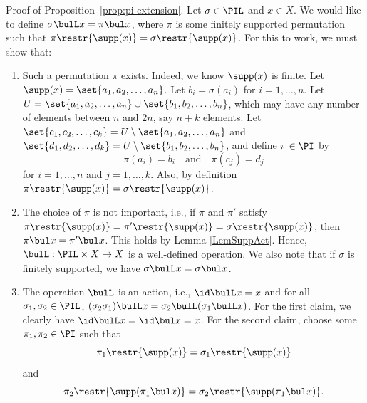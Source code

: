 \documentclass[twoside,11pt]{entics}
\begin{document}
\begin{proof*}{Proof of Proposition~\ref{prop:pi-extension}.}
Let $\sigma\in \PIL$ and $x\in X$. We would like to define $\sigma \bulL x
= \pi \bul x$, where $\pi$ is some finitely supported permutation
such that $\pi\restr{\supp(x)}=\sigma\restr{\supp(x)}$. For this to
work, we must show that:
\begin{enumerate}

\item Such a permutation $\pi$ exists. Indeed, we know $\supp(x)$ is
  finite. Let $\supp(x)=\set{a_1,a_2,\ldots, a_n}$. Let $b_i=\sigma(a_i)$
  for $i=1,\ldots,n$. Let $U=\set{a_1,a_2,\ldots, a_n} \cup
  \set{b_1,b_2,\ldots, b_n}$, which may have any number of elements
  between $n$ and $2n$, say $n+k$ elements. Let $\set{c_1,c_2,\ldots,
    c_k} = U\setminus\set{a_1,a_2,\ldots, a_n}$ and $\set{d_1,d_2,\ldots,
    d_k}=U\setminus\set{b_1,b_2,\ldots, b_n}$, and define $\pi\in \PI$ by
  \[
  \pi(a_i) = b_i \quad \mbox{and} \quad \pi(c_j) = d_j
  \]
  for $i=1,\ldots,n$ and $j=1,\ldots,k$. Also, by definition
  $\pi\restr{\supp(x)}=\sigma\restr{\supp(x)}$.

\item The choice of $\pi$ is not important, i.e., if $\pi$ and
  $\pi'$ satisfy
  $\pi\restr{\supp(x)}=\pi'\restr{\supp(x)}=\sigma\restr{\supp(x)}$,
  then $\pi \bul x = \pi' \bul x$. This holds by Lemma
  \ref{LemSuppAct}. Hence, $\bulL:\PIL\times X \to X$ is a
  well-defined operation. We also note that if $\sigma$ is finitely
  supported, we have $\sigma\bulL x = \sigma\bul x$.

\item The operation $\bulL$ is an action, i.e., $\id\bulL x =
  x$ and for all $\sigma_1,\sigma_2\in \PIL$, $(\sigma_2\sigma_1)\bulL x =
  \sigma_2\bulL (\sigma_1\bulL x)$. For the first claim, we clearly
  have $\id\bulL x = \id\bul x = x$. For the second claim,
  choose some $\pi_1,\pi_2\in\PI$ such that
  \begin{equation}\label{eqn:action-extend1}
    \pi_1\restr{\supp(x)}=\sigma_1\restr{\supp(x)}
  \end{equation}
  and
  \begin{equation}\label{eqn:action-extend2}
    \pi_2\restr{\supp(\pi_1\bul x)}=\sigma_2\restr{\supp(\pi_1\bul x)}.
  \end{equation}


\end{enumerate}
\end{proof*}
\end{document}

